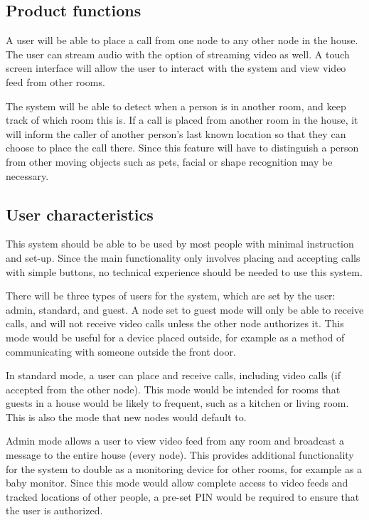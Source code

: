 \documentclass[onecolumn, draftclsnofoot,10pt, compsoc]{IEEEtran}
\begin{document}
\subsection{Product functions}
A user will be able to place a call from one node to any other node in the house. The user can stream audio with the option of streaming video as well. A touch screen interface will allow the user to interact with the system and view video feed from other rooms. 

\noindent The system will be able to detect when a person is in another room, and keep track of which room this is. If a call is placed from another room in the house, it will inform the caller of another person’s last known location so that they can choose to place the call there. Since this feature will have to distinguish a person from other moving objects such as pets, facial or shape recognition may be necessary. 

\subsection{User characteristics}
This system should be able to be used by most people with minimal instruction and set-up. Since the main functionality only involves placing and accepting calls with simple buttons, no technical experience should be needed to use this system. 

\noindent There will be three types of users for the system, which are set by the user: admin, standard, and guest. A node set to guest mode will only be able to receive calls, and will not receive video calls unless the other node authorizes it. This mode would be useful for a device placed outside, for example as a method of communicating with someone outside the front door. 

\noindent In standard mode, a user can place and receive calls, including video calls (if accepted from the other node). This mode would be intended for rooms that guests in a house would be likely to frequent, such as a kitchen or living room. This is also the mode that new nodes would default to. 

\noindent Admin mode allows a user to view video feed from any room and broadcast a message to the entire house (every node). This provides additional functionality for the system to double as a monitoring device for other rooms, for example as a baby monitor. Since this mode would allow complete access to video feeds and tracked locations of other people, a pre-set PIN would be required to ensure that the user is authorized.   
\end{document}
